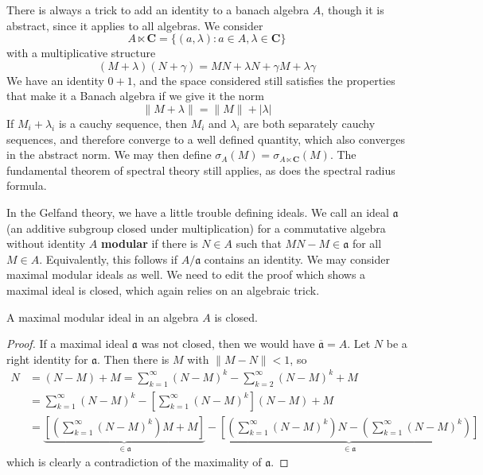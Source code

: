 There is always a trick to add an identity to a banach algebra $A$, though it is abstract, since it applies to all algebras. We consider
%
\[ A \ltimes \mathbf{C} = \{ (a,\lambda) : a \in A, \lambda \in \mathbf{C} \} \]
%
with a multiplicative structure
%
\[ (M + \lambda)(N + \gamma) = MN + \lambda N + \gamma M + \lambda \gamma \]
%
We have an identity $0 + 1$, and the space considered still satisfies the properties that make it a Banach algebra if we give it the norm
%
\[ \| M + \lambda \| = \| M \| + |\lambda| \]
%
If $M_i + \lambda_i$ is a cauchy sequence, then $M_i$ and $\lambda_i$ are both separately cauchy sequences, and therefore converge to a well defined quantity, which also converges in the abstract norm. We may then define $\sigma_A(M) = \sigma_{A \ltimes \mathbf{C}}(M)$. The fundamental theorem of spectral theory still applies, as does the spectral radius formula.

In the Gelfand theory, we have a little trouble defining ideals. We call an ideal $\mathfrak{a}$ (an additive subgroup closed under multiplication) for a commutative algebra without identity $A$ {\bf modular} if there is $N \in A$ such that $MN - M \in \mathfrak{a}$ for all $M \in A$. Equivalently, this follows if $A/\mathfrak{a}$ contains an identity. We may consider maximal modular ideals as well. We need to edit the proof which shows a maximal ideal is closed, which again relies on an algebraic trick.

\begin{lemma}
    A maximal modular ideal in an algebra $A$ is closed.
\end{lemma}
\begin{proof}
    If a maximal ideal $\mathfrak{a}$ was not closed, then we would have $\overline{\mathfrak{a}} = A$. Let $N$ be a right identity for $\mathfrak{a}$. Then there is $M$ with $\| M - N \| < 1$, so
    \begin{align*}
        N &= (N - M) + M = \sum_{k = 1}^\infty (N - M)^k - \sum_{k = 2}^\infty (N - M)^k + M\\
        &= \sum_{k = 1}^\infty (N - M)^k - \left[ \sum_{k = 1}^\infty (N - M)^k \right] (N - M) + M\\
        &= \underbrace{\left[ \left( \sum_{k = 1}^\infty (N - M)^k \right) M + M \right]}_{\in \mathfrak{a}} - \underbrace{\left[ \left( \sum_{k = 1}^\infty (N - M)^k \right) N - \left( \sum_{k = 1}^\infty (N - M)^k \right) \right]}_{\in \mathfrak{a}}
    \end{align*}
    which is clearly a contradiction of the maximality of $\mathfrak{a}$.
\end{proof}

